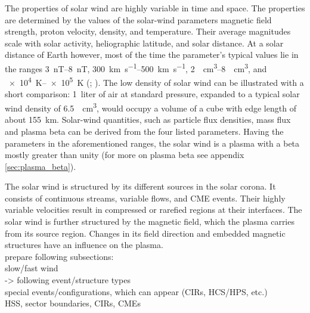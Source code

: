 The properties of solar wind are highly variable in time and space. The properties are determined by the values of the solar-wind parameters magnetic field strength, proton velocity, density, and temperature. Their average magnitudes scale with solar activity, heliographic latitude, and solar distance. At a solar distance of Earth however, most of the time the parameter's typical values lie in the ranges \SIrange{3}{8}{\nano\tesla}, \SIrange{300}{500}{\km\per\s}, \SIrange{2}{8}{\per\cm\cubed}, and \SIrange{e4}{e5}{\K} (\citet[p.~92]{Kivelson1995}; \citet{Venzmer2017}). The low density of solar wind can be illustrated with a short comparison: 1~liter of air at standard pressure, expanded to a typical solar wind density of \SI{6.5}{\per\cm\cubed}, would occupy a volume of a cube with edge length of about \SI{155}{\km}.
Solar-wind quantities, such as particle flux densities, mass flux and plasma beta can be derived from the four listed parameters. Having the parameters in the aforementioned ranges, the solar wind is a plasma with a beta mostly greater than unity (for more on plasma beta see appendix \ref{sec:plasma_beta}).

The solar wind is structured by its different sources in the solar corona. It consists of continuous streams, variable flows, and CME events. Their highly variable velocities result in compressed or rarefied regions at their interfaces. The solar wind is further structured by the magnetic field, which the plasma carries from its source region. Changes in its field direction and embedded magnetic structures have an influence on the plasma.\\


prepare following subsections:\\
slow/fast wind\\
-> following event/structure types\\
special events/configurations, which can appear (CIRs, HCS/HPS, etc.)\\
HSS, sector boundaries, CIRs, CMEs\\

